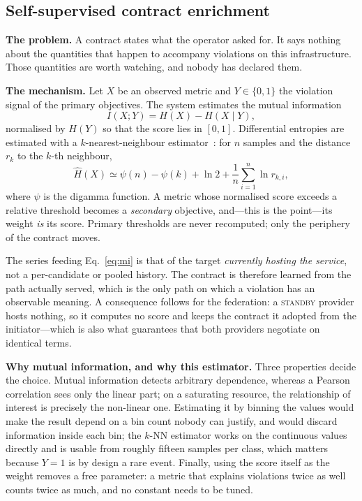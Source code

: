 \documentclass[conference]{IEEEtran}
\begin{document}
\subsection{Self-supervised contract enrichment}
\label{sec:mi}

\textbf{The problem.} A contract states what the operator asked for. It says
nothing about the quantities that happen to accompany violations on this
infrastructure. Those quantities are worth watching, and nobody has declared
them.

\textbf{The mechanism.} Let $X$ be an observed metric and $Y \in \{0,1\}$ the
violation signal of the primary objectives. The system estimates the mutual
information
\begin{equation}
I(X;Y) = H(X) - H(X \mid Y),
\label{eq:mi}
\end{equation}
normalised by $H(Y)$ so that the score lies in $[0,1]$. Differential entropies
are estimated with a $k$-nearest-neighbour
estimator~\cite{kraskov2004}: for $n$ samples and the distance $r_k$ to the
$k$-th neighbour,
\begin{equation}
\hat{H}(X) \simeq \psi(n) - \psi(k) + \ln 2 + \frac{1}{n}\sum_{i=1}^{n} \ln r_{k,i},
\label{eq:kl}
\end{equation}
where $\psi$ is the digamma function. A metric whose normalised score exceeds
a relative threshold becomes a \emph{secondary} objective, and---this is the
point---its weight \emph{is} its score. Primary thresholds are never
recomputed; only the periphery of the contract moves.

The series feeding Eq.~\eqref{eq:mi} is that of the target \emph{currently
hosting the service}, not a per-candidate or pooled history. The contract is
therefore learned from the path actually served, which is the only path on
which a violation has an observable meaning. A consequence follows for the
federation: a \textsc{standby} provider hosts nothing, so it computes no
score and keeps the contract it adopted from the initiator---which is also
what guarantees that both providers negotiate on identical terms.

\textbf{Why mutual information, and why this estimator.} Three properties
decide the choice. Mutual information detects arbitrary dependence, whereas a
Pearson correlation sees only the linear part; on a saturating resource, the
relationship of interest is precisely the non-linear one. Estimating it by
binning the values would make the result depend on a bin count nobody can
justify, and would discard information inside each bin; the $k$-NN estimator
works on the continuous values directly and is usable from roughly fifteen
samples per class, which matters because $Y=1$ is by design a rare event.
Finally, using the score itself as the weight removes a free parameter: a
metric that explains violations twice as well counts twice as much, and no
constant needs to be tuned.
\end{document}

